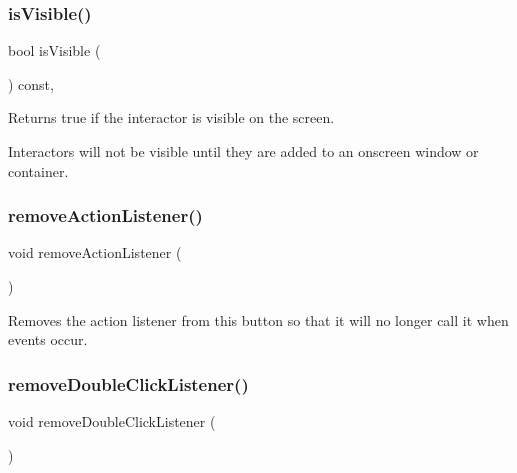 \subsubsection{\texorpdfstring{is\+Visible()}{isVisible()}}
{\footnotesize\ttfamily bool is\+Visible (\begin{DoxyParamCaption}{ }\end{DoxyParamCaption}) const\hspace{0.3cm}{\ttfamily [virtual]}, {\ttfamily [inherited]}}



Returns true if the interactor is visible on the screen. 

Interactors will not be visible until they are added to an onscreen window or container. \mbox{\label{classGButton_ab7fe7a876367b87cf7202f947f1d05e4}} 
\subsubsection{\texorpdfstring{remove\+Action\+Listener()}{removeActionListener()}}
{\footnotesize\ttfamily void remove\+Action\+Listener (\begin{DoxyParamCaption}{ }\end{DoxyParamCaption})\hspace{0.3cm}{\ttfamily [virtual]}}



Removes the action listener from this button so that it will no longer call it when events occur. 

\mbox{\label{classGButton_aa4250907e4cdd77349c04f0cf5cdd3d3}} 
\subsubsection{\texorpdfstring{remove\+Double\+Click\+Listener()}{removeDoubleClickListener()}}
{\footnotesize\ttfamily void remove\+Double\+Click\+Listener (\begin{DoxyParamCaption}{ }\end{DoxyParamCaption})\hspace{0.3cm}{\ttfamily [virtual]}}



